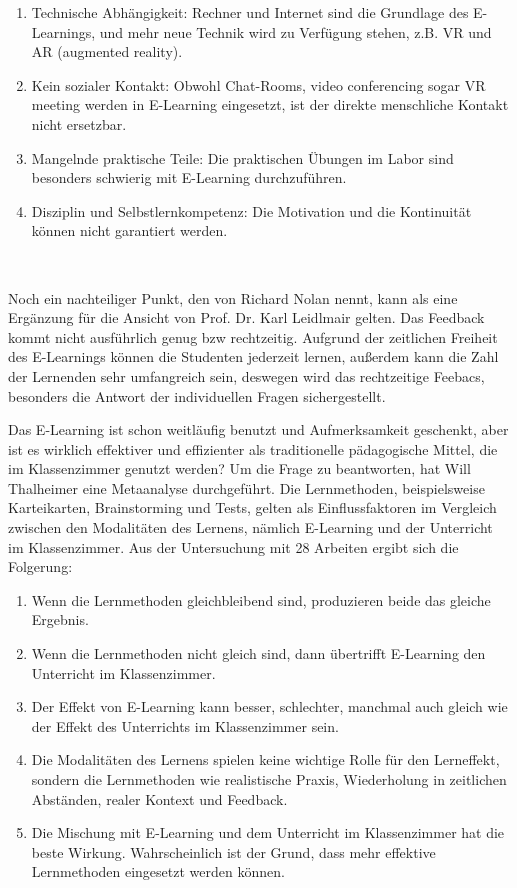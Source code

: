 \begin{enumerate}
\item Technische Abhängigkeit: Rechner und Internet sind die Grundlage des E-Learnings, und mehr neue Technik wird zu Verfügung stehen, z.B. VR und AR (augmented reality).
\item Kein sozialer Kontakt: Obwohl Chat-Rooms, video conferencing sogar VR meeting werden in E-Learning eingesetzt, ist der direkte menschliche Kontakt nicht ersetzbar.
\item Mangelnde praktische Teile: Die praktischen Übungen im Labor sind besonders schwierig mit E-Learning durchzuführen.
\item Disziplin und Selbstlernkompetenz: Die Motivation und die Kontinuität können nicht garantiert werden.
\end{enumerate}\

Noch ein nachteiliger Punkt, den von Richard Nolan\citep{5} nennt, kann als eine Ergänzung für die Ansicht von Prof. Dr. Karl Leidlmair gelten. Das Feedback kommt nicht ausführlich genug bzw rechtzeitig. Aufgrund der zeitlichen Freiheit des E-Learnings können die Studenten jederzeit lernen, außerdem kann die Zahl der Lernenden sehr umfangreich sein, deswegen wird das rechtzeitige Feebacs, besonders die Antwort der individuellen Fragen sichergestellt.

Das E-Learning ist schon weitläufig benutzt und Aufmerksamkeit geschenkt, aber ist es wirklich effektiver und effizienter als traditionelle pädagogische Mittel, die im Klassenzimmer genutzt werden? Um die Frage zu beantworten, hat Will Thalheimer\citep{8} eine Metaanalyse durchgeführt. Die Lernmethoden, beispielsweise Karteikarten, Brainstorming und Tests, gelten als Einflussfaktoren im Vergleich zwischen den Modalitäten des Lernens, nämlich E-Learning und der Unterricht im Klassenzimmer. Aus der Untersuchung mit 28 Arbeiten ergibt sich die Folgerung:

\begin{enumerate}
\item Wenn die Lernmethoden gleichbleibend sind, produzieren beide das gleiche Ergebnis.
\item Wenn die Lernmethoden nicht gleich sind, dann übertrifft E-Learning den Unterricht im Klassenzimmer.
\item Der Effekt von E-Learning kann besser, schlechter, manchmal auch gleich wie der Effekt des Unterrichts im Klassenzimmer sein.
\item Die Modalitäten des Lernens spielen keine wichtige Rolle für den Lerneffekt, sondern die Lernmethoden wie realistische Praxis, Wiederholung in zeitlichen Abständen, realer Kontext und Feedback.
\item Die Mischung mit E-Learning und dem Unterricht im Klassenzimmer hat die beste Wirkung. Wahrscheinlich ist der Grund, dass mehr effektive Lernmethoden eingesetzt werden können. 
\end{enumerate}\

